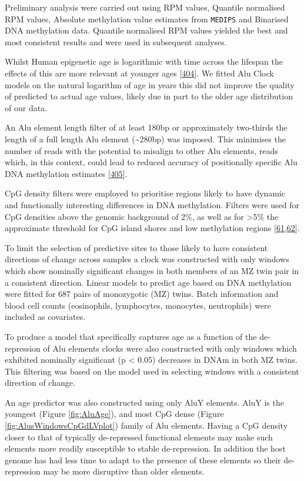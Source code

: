 \documentclass[
]{book}
\begin{document}
Preliminary analysis were carried out using RPM values, Quantile normalised RPM values, Absolute methylation value estimates from \texttt{MEDIPS} and Binarised DNA methylation data.
Quantile normalised RPM values yielded the best and most consistent results and were used in subsequent analyses.

Whilst Human epigenetic age is logarithmic with time across the lifespan the effects of this are more relevant at younger ages {[}\protect\hyperlink{ref-Snir2019}{404}{]}.
We fitted Alu Clock models on the natural logarithm of age in years this did not improve the quality of predicted to actual age values, likely due in part to the older age distribution of our data.

An Alu element length filter of at least 180bp or approximately two-thirds the length of a full length Alu element (\textasciitilde280bp) was imposed.
This minimises the number of reads with the potential to misalign to other Alu elements, reads which, in this context, could lead to reduced accuracy of positionally specific Alu DNA methylation estimates {[}\protect\hyperlink{ref-Hellen2013}{405}{]}.

CpG density filters were employed to prioritise regions likely to have dynamic and functionally interesting differences in DNA methylation.
Filters were used for CpG densities above the genomic background of 2\%, as well as for \textgreater5\% the approximate threshold for CpG island shores and low methylation regions {[}\protect\hyperlink{ref-Stadler2011}{61},\protect\hyperlink{ref-Irizarry2009}{62}{]}.

To limit the selection of predictive sites to those likely to have consistent directions of change across samples a clock was constructed with only windows which show nominally significant changes in both members of an MZ twin pair in a consistent direction.
Linear models to predict age based on DNA methylation were fitted for 687 pairs of monozygotic (MZ) twins.
Batch information and blood cell counts (eosinophils, lymphocytes, monocytes, neutrophils) were included as covariates.

To produce a model that specifically captures age as a function of the de-repression of Alu elements clocks were also constructed with only windows which exhibited nominally significant (p \textless{} 0.05) decreases in DNAm in both MZ twins.
This filtering was based on the model used in selecting windows with a consistent direction of change.

An age predictor was also constructed using only AluY elements.
AluY is the youngest (Figure \ref{fig:AluAge}), and most CpG dense (Figure \ref{fig:AlusWindowsCpGdLVplot}) family of Alu elements.
Having a CpG density closer to that of typically de-repressed functional elements may make such elements more readily susceptible to stable de-repression.
In addition the host genome has had less time to adapt to the presence of these elements so their de-repression may be more disruptive than older elements.
\end{document}
